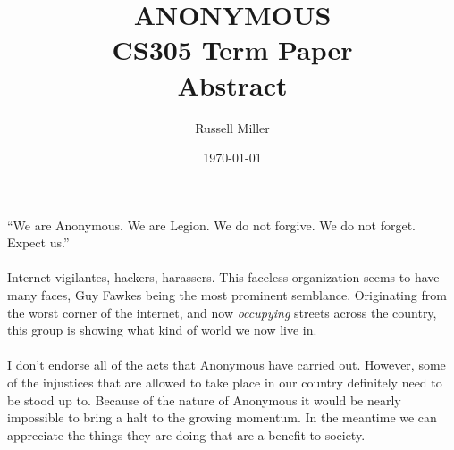 \documentclass{article}
\title{ANONYMOUS\\
CS305 Term Paper\\
Abstract}
\author{Russell Miller}
\date{\today}
\begin{document}
\maketitle

``We are Anonymous. We are Legion. We do not forgive. We do not forget. Expect 
us.''\\
\\
Internet vigilantes, hackers, harassers. This faceless organization seems to 
have many faces, Guy Fawkes being the most prominent semblance. Originating 
from the worst corner of the internet, and now \emph{occupying} streets across 
the country, this group is showing what kind of world we now live in.\\
\\
I don't endorse all of the acts that Anonymous have carried out. However, some
of the injustices that are allowed to take place in our country definitely
need to be stood up to. Because of the nature of Anonymous it would be nearly
impossible to bring a halt to the growing momentum. In the meantime we can
appreciate the things they are doing that are a benefit to society.
\end{document}

